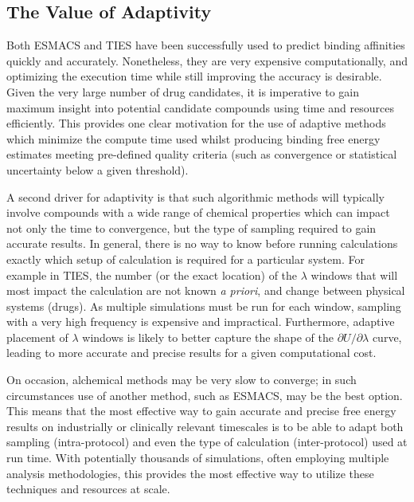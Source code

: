 
\subsection{The Value of Adaptivity}

Both ESMACS and TIES have been successfully used to predict binding affinities
quickly and accurately. Nonetheless, they are very expensive computationally,
and optimizing the execution time while still improving the accuracy is
desirable. Given the very large number of drug candidates, it is imperative to
gain maximum insight into potential candidate compounds using time and
resources efficiently. This provides one clear motivation for the use of
adaptive methods which minimize the compute time used whilst producing binding
free energy estimates meeting pre-defined quality criteria (such as
convergence or statistical uncertainty below a given threshold).
  

A second driver for adaptivity is that such algorithmic methods  will
typically involve compounds with a wide range of chemical properties which can
impact not only the time to convergence, but the type of sampling required to
gain accurate results. In general, there is no way to know before running
calculations exactly which setup of calculation is required for a particular
system. For example in TIES, the number (or the exact location) of the
$\lambda$ windows that will most impact the calculation are not known
\textit{a priori}, and change between physical systems (drugs). As multiple
simulations must be run for each window, sampling with a very high frequency
is expensive and impractical. Furthermore, adaptive placement of $\lambda$
windows is likely to better capture the shape of the 
$\partial U/\partial\lambda$ curve, leading to more accurate and precise 
results for a given computational cost.

On occasion, alchemical methods may be very slow to converge; in such
circumstances use of another method, such as ESMACS, may be the best option.
This means that the most effective way to gain accurate and precise free
energy results on industrially or clinically relevant timescales is to be able
to adapt both sampling (intra-protocol) and even the type of calculation 
(inter-protocol) used at run time. With potentially thousands of simulations, 
often employing multiple analysis methodologies, this provides the most 
effective way to utilize these techniques and resources at scale.

